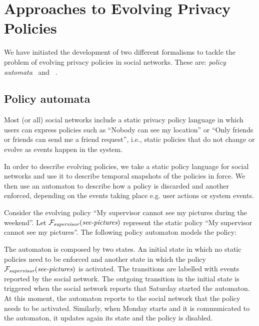 \section{Approaches to Evolving Privacy Policies}

We have initiated the development of two different formalisms to tackle the problem of evolving privacy policies in social networks. These are: {\em policy automata}~\cite{PCPS16aaeppsn} and \tfppf~\cite{PKSS16sepposn}.

\subsection{Policy automata}

Most (or all) social networks include a static privacy policy language in which users can express policies such as ``Nobody can see my location'' or ``Only friends or friends can send me a friend request'', i.e., static policies that do not change or evolve as events happen in the system.

In order to describe evolving policies, we take a static policy language for social networks and use it to describe temporal snapshots of the policies in force. We then use an automaton to describe how a policy is discarded and another enforced, depending on the events taking place e.g. user actions or system events.

\begin{example}

Consider the evolving policy ``My supervisor cannot see my pictures during the weekend''. Let ${\mathcal F}_{\textit{supervisor}}(\textit{see-pictures})$ represent the static policy ``My supervisor cannot see my pictures''. The following policy automaton models the policy:

\centerline{}

The automaton is composed by two states. An initial state in which no static policies need to be enforced and another state in which the policy ${\mathcal F}_{\textit{supervisor}}(\textit{see-pictures})$ is activated. The transitions are labelled with events reported by the social network. The outgoing transition in the initial state is triggered when the social network reports that Saturday started the automaton. At this moment, the automaton reports to the social network that the policy needs to be activated. Similarly, when Monday starts and it is communicated to the automaton, it updates again its state and the policy is disabled.
\end{example}

